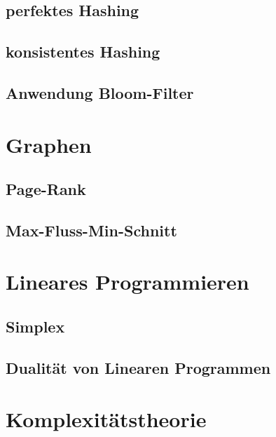 \subsection{perfektes Hashing}
\subsection{konsistentes Hashing}
\subsection{Anwendung Bloom-Filter}


\section{Graphen}

\subsection{Page-Rank}
\subsection{Max-Fluss-Min-Schnitt}


\section{Lineares Programmieren}

\subsection{Simplex}
\subsection{Dualität von Linearen Programmen}

\section{Komplexitätstheorie}
